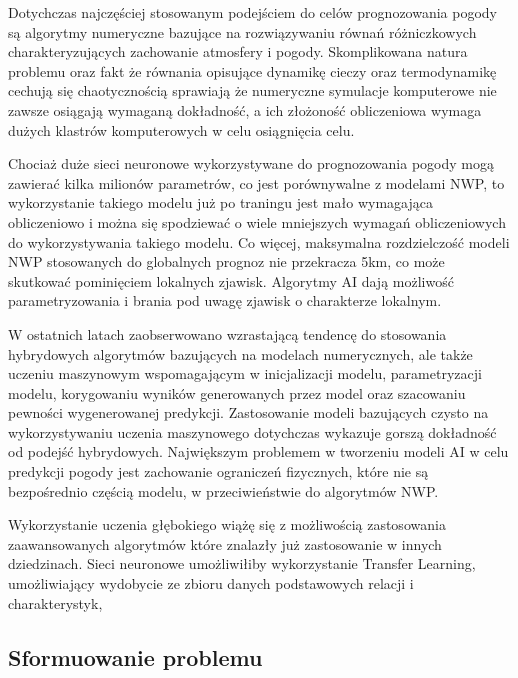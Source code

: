 Dotychczas najczęściej stosowanym podejściem do celów prognozowania
pogody są algorytmy numeryczne bazujące na rozwiązywaniu równań różniczkowych
charakteryzujących zachowanie atmosfery i pogody. Skomplikowana natura
problemu oraz fakt że równania opisujące dynamikę cieczy oraz termodynamikę
cechują się chaotycznością sprawiają że numeryczne symulacje komputerowe
nie zawsze osiągają wymaganą dokładność, a ich złożoność obliczeniowa
wymaga dużych klastrów komputerowych w celu osiągnięcia celu.

Chociaż duże sieci neuronowe wykorzystywane do prognozowania pogody
mogą zawierać kilka milionów parametrów, co jest porównywalne z modelami
NWP\cite{can-dl-beat-numerical}, to wykorzystanie takiego modelu już po traningu
jest mało wymagająca obliczeniowo i można się spodziewać o wiele mniejszych wymagań
obliczeniowych do wykorzystywania takiego modelu. Co więcej, maksymalna rozdzielczość
modeli NWP stosowanych do globalnych prognoz nie przekracza 5km, 
co może skutkować pominięciem lokalnych zjawisk. Algorytmy AI dają możliwość
parametryzowania i brania pod uwagę zjawisk o charakterze lokalnym.

W ostatnich latach zaobserwowano wzrastającą tendencę do stosowania hybrydowych
algorytmów bazujących na modelach numerycznych, ale także uczeniu maszynowym
wspomagającym w inicjalizacji modelu, parametryzacji modelu, korygowaniu
wyników generowanych przez model oraz szacowaniu pewności wygenerowanej
predykcji. Zastosowanie modeli bazujących czysto na wykorzystywaniu uczenia
maszynowego dotychczas wykazuje gorszą dokładność od podejść hybrydowych.
Największym problemem w tworzeniu modeli AI w celu predykcji pogody jest
zachowanie ograniczeń fizycznych, które nie są bezpośrednio częścią modelu,
w przeciwieństwie do algorytmów NWP.

Wykorzystanie uczenia głębokiego wiążę się z możliwością zastosowania 
zaawansowanych algorytmów które znalazły już zastosowanie w innych dziedzinach.
Sieci neuronowe umożliwiłiby wykorzystanie Transfer Learning, umożliwiający
wydobycie ze zbioru danych podstawowych relacji i charakterystyk,


\subsection{Sformuowanie problemu}

